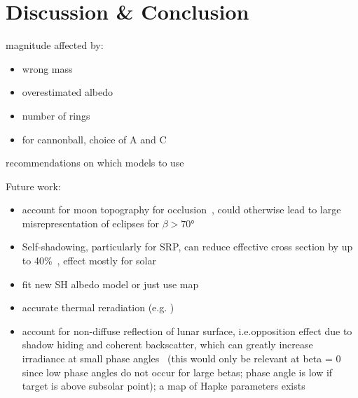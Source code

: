 \section{Discussion \& Conclusion}


magnitude affected by:
\begin{itemize}
    \item wrong mass
    \item overestimated albedo
    \item number of rings
    \item for cannonball, choice of A and C
\end{itemize}

recommendations on which models to use


Future work:
\begin{itemize}
    \item account for moon topography for occlusion~\cite{Mazarico2018}, could otherwise lead to large misrepresentation of eclipses for $\beta > \ang{70}$
    \item Self-shadowing, particularly for SRP, can reduce effective cross section by up to 40\%~\cite{Mazarico2018}, effect mostly for solar~\cite{Mazarico2009}
    \item fit new SH albedo model or just use map
    \item accurate thermal reradiation (e.g. \cite{Marshall1994})
    \item account for non-diffuse reflection of lunar surface, i.e.opposition effect due to shadow hiding and coherent backscatter, which can greatly increase irradiance at small phase angles~\cite{Buratti1996} (this would only be relevant at beta = 0 since low phase angles do not occur for large betas; phase angle is low if target is above subsolar point); a map of Hapke parameters exists~\cite{Sato2014}
\end{itemize}



\FloatBarrier

